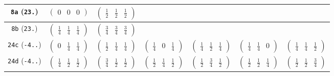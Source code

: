 \documentclass[fleqn,9pt,landscape]{jsarticle}
\begin{document}
\begin{center}
\begin{longtable}{ccccccc}
{\tt 8a} ({\tt 23.}) & $ \begin{pmatrix} 0 & 0 & 0 \end{pmatrix} $ & $ \begin{pmatrix} \frac{1}{2} & \frac{1}{2} & \frac{1}{2} \end{pmatrix} $ & $  $ & $  $ & $  $ & $  $ \\ \hline
{\tt 8b} ({\tt 23.}) & $ \begin{pmatrix} \frac{1}{4} & \frac{1}{4} & \frac{1}{4} \end{pmatrix} $ & $ \begin{pmatrix} \frac{3}{4} & \frac{3}{4} & \frac{3}{4} \end{pmatrix} $ & $  $ & $  $ & $  $ & $  $ \\ \hline
{\tt 24c} ({\tt -4..}) & $ \begin{pmatrix} 0 & \frac{1}{4} & \frac{1}{4} \end{pmatrix} $ & $ \begin{pmatrix} \frac{1}{2} & \frac{1}{4} & \frac{1}{4} \end{pmatrix} $ & $ \begin{pmatrix} \frac{1}{4} & 0 & \frac{1}{4} \end{pmatrix} $ & $ \begin{pmatrix} \frac{1}{4} & \frac{1}{2} & \frac{1}{4} \end{pmatrix} $ & $ \begin{pmatrix} \frac{1}{4} & \frac{1}{4} & 0 \end{pmatrix} $ & $ \begin{pmatrix} \frac{1}{4} & \frac{1}{4} & \frac{1}{2} \end{pmatrix} $ \\ \hline
{\tt 24d} ({\tt -4..}) & $ \begin{pmatrix} \frac{1}{4} & \frac{1}{2} & \frac{1}{2} \end{pmatrix} $ & $ \begin{pmatrix} \frac{3}{4} & \frac{1}{2} & \frac{1}{2} \end{pmatrix} $ & $ \begin{pmatrix} \frac{1}{2} & \frac{1}{4} & \frac{1}{2} \end{pmatrix} $ & $ \begin{pmatrix} \frac{1}{2} & \frac{3}{4} & \frac{1}{2} \end{pmatrix} $ & $ \begin{pmatrix} \frac{1}{2} & \frac{1}{2} & \frac{1}{4} \end{pmatrix} $ & $ \begin{pmatrix} \frac{1}{2} & \frac{1}{2} & \frac{3}{4} \end{pmatrix} $ \\ \hline

\end{longtable}
\end{center}
\end{document}
